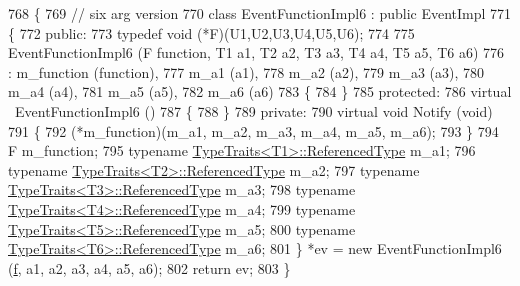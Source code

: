 \begin{DoxyCode}
768 \{
769   \textcolor{comment}{// six arg version}
770   \textcolor{keyword}{class }EventFunctionImpl6 : \textcolor{keyword}{public} EventImpl
771   \{
772 \textcolor{keyword}{public}:
773     \textcolor{keyword}{typedef} void (*F)(U1,U2,U3,U4,U5,U6);
774 
775     EventFunctionImpl6 (F \textcolor{keyword}{function}, T1 a1, T2 a2, T3 a3, T4 a4, T5 a5, T6 a6)
776       : m\_function (function),
777         m\_a1 (a1),
778         m\_a2 (a2),
779         m\_a3 (a3),
780         m\_a4 (a4),
781         m\_a5 (a5),
782         m\_a6 (a6)
783     \{
784     \}
785 \textcolor{keyword}{protected}:
786     \textcolor{keyword}{virtual} ~EventFunctionImpl6 ()
787     \{
788     \}
789 \textcolor{keyword}{private}:
790     \textcolor{keyword}{virtual} \textcolor{keywordtype}{void} Notify (\textcolor{keywordtype}{void})
791     \{
792       (*m\_function)(m\_a1, m\_a2, m\_a3, m\_a4, m\_a5, m\_a6);
793     \}
794     F m\_function;
795     \textcolor{keyword}{typename} \hyperlink{structTypeTraits}{TypeTraits<T1>::ReferencedType} m\_a1;
796     \textcolor{keyword}{typename} \hyperlink{structTypeTraits}{TypeTraits<T2>::ReferencedType} m\_a2;
797     \textcolor{keyword}{typename} \hyperlink{structTypeTraits}{TypeTraits<T3>::ReferencedType} m\_a3;
798     \textcolor{keyword}{typename} \hyperlink{structTypeTraits}{TypeTraits<T4>::ReferencedType} m\_a4;
799     \textcolor{keyword}{typename} \hyperlink{structTypeTraits}{TypeTraits<T5>::ReferencedType} m\_a5;
800     \textcolor{keyword}{typename} \hyperlink{structTypeTraits_aad10ee3d301aeae33030c336748843b5}{TypeTraits<T6>::ReferencedType} m\_a6;
801   \} *ev = \textcolor{keyword}{new} EventFunctionImpl6 (\hyperlink{buildings__pathloss_8m_aa52d3a6e3de5a80a97c12364caeaa125}{f}, a1, a2, a3, a4, a5, a6);
802   \textcolor{keywordflow}{return} ev;
803 \}
\end{DoxyCode}
